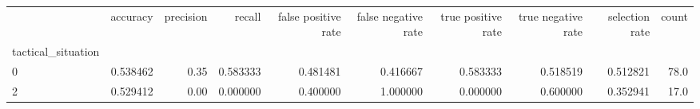 \begin{tabular}{lrrrrrrrrr}
\toprule
{} &  accuracy &  precision &    recall &  false positive rate &  false negative rate &  true positive rate &  true negative rate &  selection rate &  count \\
tactical\_situation &           &            &           &                      &                      &                     &                     &                 &        \\
\midrule
0                  &  0.538462 &       0.35 &  0.583333 &             0.481481 &             0.416667 &            0.583333 &            0.518519 &        0.512821 &   78.0 \\
2                  &  0.529412 &       0.00 &  0.000000 &             0.400000 &             1.000000 &            0.000000 &            0.600000 &        0.352941 &   17.0 \\
\bottomrule
\end{tabular}

